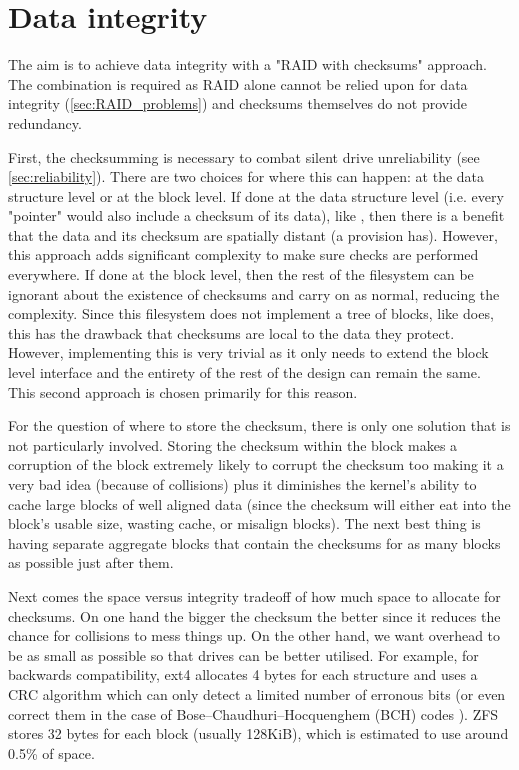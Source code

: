     \section{Data integrity}
        \label{sec:data_integrity}

        The aim is to achieve data integrity with a "RAID with checksums"
        approach. The combination is required as RAID alone cannot be relied
        upon for data integrity (\autoref{sec:RAID_problems}) and checksums
        themselves do not provide redundancy.

        First, the checksumming is necessary to combat silent drive
        unreliability (see \autoref{sec:reliability}). There are two choices for
        where this can happen: at the data structure level or at the block
        level. If done at the data structure level (i.e. every "pointer" would
        also include a checksum of its data), like , then
        there is a benefit that the data and its checksum are spatially distant
        (a provision  has). However, this approach adds
        significant complexity to make sure checks are performed everywhere. If
        done at the block level, then the rest of the filesystem can be
        ignorant about the existence of checksums and carry on as normal,
        reducing the complexity. Since this filesystem does not implement a
        tree of blocks, like  does, this has the drawback
        that checksums are local to the data they protect. However,
        implementing this is very trivial as it only needs to extend the block
        level interface and the entirety of the rest of the design can remain
        the same. This second approach is chosen primarily for this reason.

        For the question of where to store the checksum, there is only one
        solution that is not particularly involved. Storing the checksum within
        the block makes a corruption of the block extremely likely to corrupt
        the checksum too making it a very bad idea (because of collisions) plus
        it diminishes the kernel's ability to cache large blocks of well
        aligned data (since the checksum will either eat into the block's
        usable size, wasting cache, or misalign blocks). The next best thing is
        having separate aggregate blocks that contain the checksums for as many
        blocks as possible just after them.

        Next comes the space versus integrity tradeoff of how much space to
        allocate for checksums. On one hand the bigger the checksum the better
        since it reduces the chance for collisions to mess things up. On the
        other hand, we want overhead to be as small as possible so that drives
        can be better utilised. For example, for backwards compatibility, ext4
        allocates 4 bytes for each structure \cite{ext4_docs} and uses a CRC
        algorithm which can only detect a limited number of erronous bits (or
        even correct them in the case of Bose–Chaudhuri–Hocquenghem (BCH) codes
        \cite{flash_error_manual}). ZFS stores 32 bytes \cite{ZFS_docs} for
        each block (usually 128KiB), which is estimated to use around 0.5\%
        \cite{ZFS_overhead} of space.

